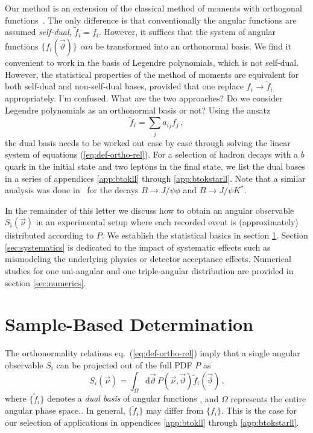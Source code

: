 \documentclass[aps,prd,reprint,nofootinbib,preprintnumbers]{revtex4}
\newcommand{\dual}[1]{\tilde{#1}}
\newcommand{\nuvec}{\vec{\nu}}
\newcommand{\refeq}[1]{eq.~(\ref{eq:#1})}
\newcommand{\rmdx}[1]{\mbox{d} #1 \,} %
\newcommand{\thvec}{\vec{\vartheta}}
\renewcommand{\theta}{\vartheta}
\newcommand{\fred}[1]{{\color{brown!85!black}#1}}
\newcommand{\add}[1]{\textcolor{green!85!black}{#1}}
\begin{document}
Our method is an extension of the classical method of moments with
orthogonal functions~\cite[sec. 8.2]{James:2006zz}. The only difference
is that conventionally the angular functions are assumed
\emph{self-dual}, $\dual{f}_i = f_i$. However, it suffices that the
system of angular functions $\{f_i(\thvec)\}$ \emph{can} be transformed into
an orthonormal basis. \add{We find it convenient to work
in the basis of Legendre polynomials, which is not self-dual.
However, the statistical properties of the method of moments are equivalent for both self-dual and non-self-dual
bases, provided that one replace $f_i \to \dual{f}_i$ appropriately.}
\fred{I'm confused. What are the two approaches? Do we consider Legendre polynomials as an orthonormal basis or not?}
Using the ansatz
\begin{equation}
  \label{eq:dual-ansatz}
  \dual{f}_i = \sum_{j} a_{ij} f_j \,,
\end{equation}
the dual basis needs to be worked out case by case through solving the
linear system of equations (\ref{eq:def-ortho-rel}). For a selection
of hadron decays with a $b$ quark in the initial state and two leptons
in the final state, we list the dual bases in a series of appendices
\ref{app:btokll} through \ref{app:btokstarll}. Note that a
similar analysis was done in~\cite{Dighe:1998vk} for the decays $B \to
J/\psi \phi$ and $B \to J/\psi K^{*}$.

In the remainder of this letter we discuss how to obtain an angular
observable $S_i(\nuvec)$ in an experimental setup where each recorded
event is (approximately) distributed according to $P$.  We establish
the statistical basics in section \ref{sec:sample-based-det}. Section
\ref{sec:systematics} is dedicated to the impact of systematic effects
such as mismodeling the underlying physics or detector acceptance
effects. Numerical studies for one uni-angular and one triple-angular
distribution are provided in section \ref{sec:numerics}.

\section{Sample-Based Determination}
\label{sec:sample-based-det}

The orthonormality relations \refeq{def-ortho-rel} imply that a single angular observable $S_i$
can be projected out of the full PDF $P$ as
\begin{equation}
    \label{eq:det-Pi-analytical}
    S_i(\nuvec) = \int_{\Omega} \rmdx{\vec\theta}  P(\nuvec, \thvec) \dual{f}_i(\thvec)\,.
\end{equation}
where $\lbrace \dual{f}_i \rbrace$ denotes a \emph{dual basis} of angular functions
\add{, and $\Omega$ represents the entire angular phase space.}. In general, $\lbrace \dual{f}_i \rbrace$ may differ from $\lbrace f_i \rbrace$. This is the
case for our selection of applications in appendices \ref{app:btokll} through \ref{app:btokstarll}.\\
\end{document}
